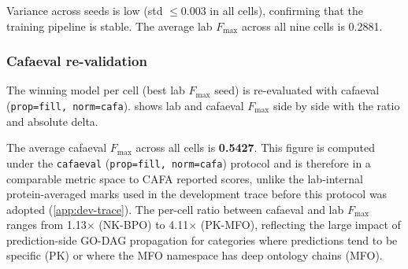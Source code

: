 Variance across seeds is low (std $\leq 0.003$ in all cells), confirming
that the training pipeline is stable. The average lab $F_{\max}$ across all
nine cells is 0.2881.

\subsubsection{Cafaeval re-validation}

The winning model per cell (best lab $F_{\max}$ seed) is re-evaluated with
cafaeval (\texttt{prop=fill, norm=cafa}).  shows lab
and cafaeval $F_{\max}$ side by side with the ratio and absolute delta.

\begin{table}[htbp]
  \centering
  \caption[Re-ranker (56-feature): lab vs cafaeval Fmax (winner per cell)]{Re-ranker 56-feature: lab $F_{\max}$ vs cafaeval $F_{\max}$ for the winner per cell.}
  \label{tab:exp8-cafaeval}
\end{table}

The average cafaeval $F_{\max}$ across all cells is \textbf{0.5427}. This figure
is computed under the \texttt{cafaeval} (\texttt{prop=fill, norm=cafa}) protocol
and is therefore in a comparable metric space to CAFA reported scores, unlike
the lab-internal protein-averaged marks used in the development trace before this
protocol was adopted (\cref{app:dev-trace}).
The per-cell ratio between cafaeval and lab $F_{\max}$ ranges from
1.13$\times$ (NK-BPO) to 4.11$\times$ (PK-MFO), reflecting the large impact
of prediction-side GO-DAG propagation for categories where predictions tend to
be specific (PK) or where the MFO namespace has deep ontology chains (MFO).

